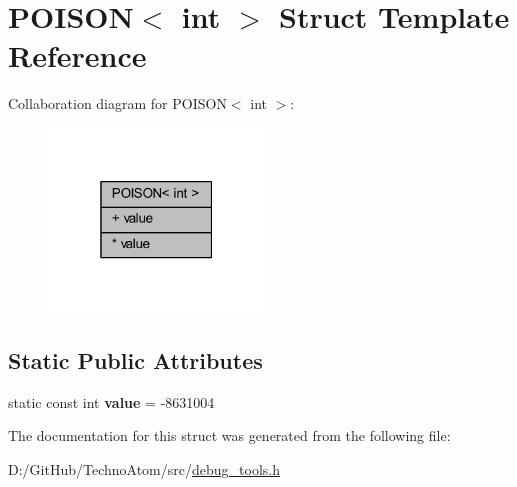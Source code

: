 \hypertarget{struct_p_o_i_s_o_n_3_01int_01_4}{}\section{P\+O\+I\+S\+ON$<$ int $>$ Struct Template Reference}
\label{struct_p_o_i_s_o_n_3_01int_01_4}


Collaboration diagram for P\+O\+I\+S\+ON$<$ int $>$\+:
\nopagebreak
\begin{figure}[H]
\begin{center}
\leavevmode
\includegraphics[width=163pt]{struct_p_o_i_s_o_n_3_01int_01_4__coll__graph}
\end{center}
\end{figure}
\subsection*{Static Public Attributes}
\textbf{ }\par
\begin{DoxyCompactItemize}
\item 
\mbox{\label{struct_p_o_i_s_o_n_3_01int_01_4_a4a7b41de4a6a4e91119dc2bfab15ba07}} 
static const int {\bfseries value} = -\/8631004
\end{DoxyCompactItemize}



The documentation for this struct was generated from the following file\+:\begin{DoxyCompactItemize}
\item 
D\+:/\+Git\+Hub/\+Techno\+Atom/src/\hyperlink{debug__tools_8h}{debug\+\_\+tools.\+h}\end{DoxyCompactItemize}
